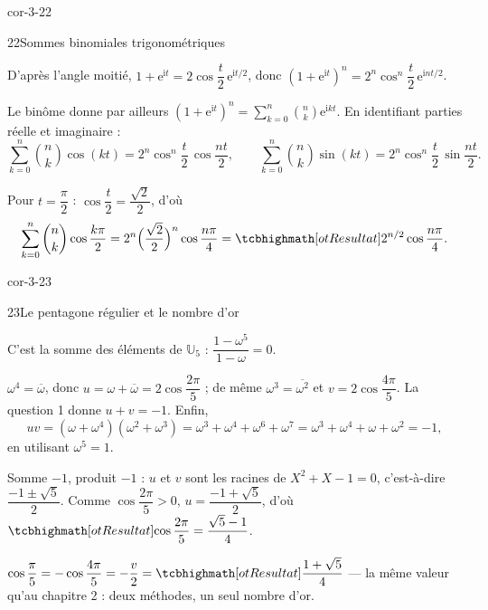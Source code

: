 \begin{blocLivre}{cor-3-22}
\begin{corrige}{22}{Sommes binomiales trigonométriques}
\begin{questions}
  \item D'après l'angle moitié,
    $1+\mathrm{e}^{\mathrm{i}t}=2\cos\dfrac{t}{2}\,\mathrm{e}^{\mathrm{i}t/2}$, donc
    $(1+\mathrm{e}^{\mathrm{i}t})^{n}=2^{n}\cos^{n}\dfrac{t}{2}\,\mathrm{e}^{\mathrm{i}nt/2}$.
  \item Le binôme donne par ailleurs
    $(1+\mathrm{e}^{\mathrm{i}t})^{n}=\displaystyle\sum_{k=0}^{n}\binom{n}{k}\mathrm{e}^{\mathrm{i}kt}$.
    En identifiant parties réelle et imaginaire :
    \[
      \sum_{k=0}^{n}\binom{n}{k}\cos(kt)=2^{n}\cos^{n}\frac{t}{2}\,\cos\frac{nt}{2},
      \qquad
      \sum_{k=0}^{n}\binom{n}{k}\sin(kt)=2^{n}\cos^{n}\frac{t}{2}\,\sin\frac{nt}{2}.
    \]
  \item Pour $t=\dfrac{\pi}{2}$ : $\cos\dfrac{t}{2}=\dfrac{\sqrt2}{2}$, d'où
    \[
      \sum_{k=0}^{n}\binom{n}{k}\cos\frac{k\pi}{2}
      =2^{n}\Bigl(\frac{\sqrt2}{2}\Bigr)^{n}\cos\frac{n\pi}{4}
      =\res{2^{n/2}\cos\frac{n\pi}{4}}.
    \]
\end{questions}
\end{corrige}
\end{blocLivre}

\begin{blocLivre}{cor-3-23}
\begin{corrige}{23}{Le pentagone régulier et le nombre d'or}
\begin{questions}
  \item C'est la somme des éléments de $\mathbb{U}_5$ :
    $\dfrac{1-\omega^{5}}{1-\omega}=0$.
  \item $\omega^{4}=\overline{\omega}$, donc
    $u=\omega+\overline{\omega}=2\cos\dfrac{2\pi}{5}$ ; de même
    $\omega^{3}=\overline{\omega^{2}}$ et $v=2\cos\dfrac{4\pi}{5}$.
    La question 1 donne $u+v=-1$. Enfin,
    \[
      uv=(\omega+\omega^{4})(\omega^{2}+\omega^{3})
      =\omega^{3}+\omega^{4}+\omega^{6}+\omega^{7}
      =\omega^{3}+\omega^{4}+\omega+\omega^{2}=-1,
    \]
    en utilisant $\omega^{5}=1$.
  \item Somme $-1$, produit $-1$ : $u$ et $v$ sont les racines de
    $X^{2}+X-1=0$, c'est-à-dire $\dfrac{-1\pm\sqrt5}{2}$. Comme
    $\cos\dfrac{2\pi}{5}>0$, $u=\dfrac{-1+\sqrt5}{2}$, d'où
    $\res{\cos\dfrac{2\pi}{5}=\dfrac{\sqrt5-1}{4}}$.
  \item $\cos\dfrac{\pi}{5}=-\cos\dfrac{4\pi}{5}=-\dfrac{v}{2}
    =\res{\dfrac{1+\sqrt5}{4}}$ — la même valeur qu'au chapitre 2 :
    deux méthodes, un seul nombre d'or.
\end{questions}
\end{corrige}
\end{blocLivre}

